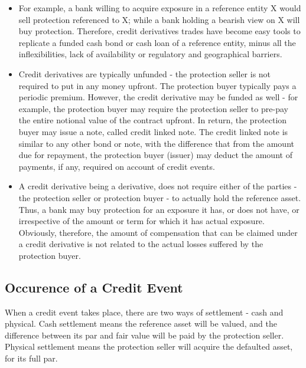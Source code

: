\documentclass[]{article}
\begin{document}
\begin{itemize}
\item For example, a bank willing to acquire exposure in a reference entity X would sell protection referenced to X; while a bank holding a bearish view on X will buy protection. Therefore, credit derivatives trades have become easy tools to replicate a funded cash bond or cash loan of a reference entity, minus all the inflexibilities, lack of availability or regulatory and geographical barriers.

\item Credit derivatives are typically unfunded - the protection seller is not required to put in any money upfront. The protection buyer typically pays a periodic premium. However, the credit derivative may be funded as well - for example, the protection buyer may require the protection seller to pre-pay the entire notional value of the contract upfront. In return, the protection buyer may issue a note, called credit linked note. The credit linked note is similar to any other bond or note, with the difference that from the amount due for repayment, the protection buyer (issuer) may deduct the amount of payments, if any, required on account of credit events.

\item A credit derivative being a derivative, does not require either of the parties - the protection seller or protection buyer - to actually hold the reference asset. Thus, a bank may buy protection for an exposure it has, or does not have, or irrespective of the amount or term for which it has actual exposure. Obviously, therefore, the amount of compensation that can be claimed under a credit derivative is not related to the actual losses suffered by the protection buyer.
\end{itemize}
\subsection{Occurence of a Credit Event}
When a credit event takes place, there are two ways of settlement - cash and physical. Cash settlement means the reference asset will be valued, and the difference between its par and fair value will be paid by the protection seller. Physical settlement means the protection seller will acquire the defaulted asset, for its full par.
\end{document}
